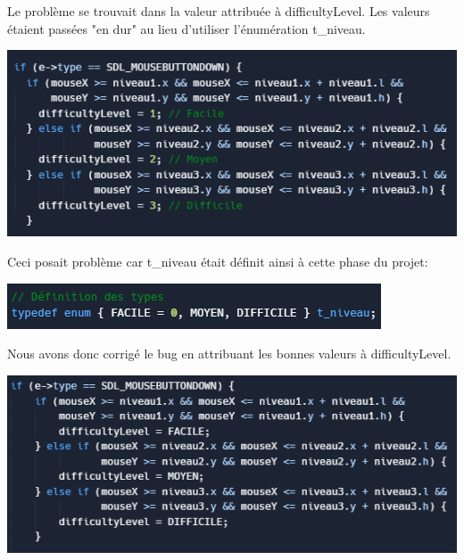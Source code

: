 \documentclass[12pt, a4paper, oneside]{article}
\begin{document}
    Le problème se trouvait dans la valeur attribuée à difficultyLevel. Les valeurs étaient passées "en dur" au lieu d'utiliser
    l'énumération t\_niveau.

    \begin{center}
        \includegraphics[scale=0.7]{erreur.png}
    \end{center}

    Ceci posait problème car t\_niveau était définit ainsi à cette phase du projet:

    \begin{center}
        \includegraphics[scale=0.7]{tniveau.png}
    \end{center}

    Nous avons donc corrigé le bug en attribuant les bonnes valeurs à difficultyLevel.
    
    \begin{center}
        \includegraphics[scale=0.7]{erreur_corrigee.png}
    \end{center}

\newpage
\end{document}
